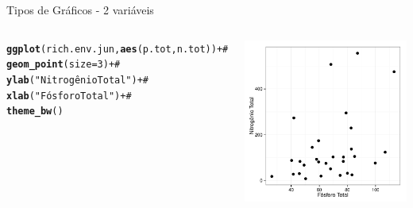 \documentclass{beamer}\usepackage[]{graphicx}\usepackage[]{color}
\makeatletter
\newcommand{\hlnum}[1]{\textcolor[rgb]{0.686,0.059,0.569}{#1}}%
\newcommand{\hlstr}[1]{\textcolor[rgb]{0.192,0.494,0.8}{#1}}%
\newcommand{\hlcom}[1]{\textcolor[rgb]{0.678,0.584,0.686}{\textit{#1}}}%
\newcommand{\hlopt}[1]{\textcolor[rgb]{0,0,0}{#1}}%
\newcommand{\hlstd}[1]{\textcolor[rgb]{0.345,0.345,0.345}{#1}}%
\newcommand{\hlkwc}[1]{\textcolor[rgb]{0.333,0.667,0.333}{#1}}%
\newcommand{\hlkwd}[1]{\textcolor[rgb]{0.737,0.353,0.396}{\textbf{#1}}}%
\newenvironment{kframe}{%
 \def\at@end@of@kframe{}%
 \ifinner\ifhmode%
  \def\at@end@of@kframe{\end{minipage}}%
  \begin{minipage}{\columnwidth}%
 \fi\fi%
 \def\FrameCommand##1{\hskip\@totalleftmargin \hskip-\fboxsep
 \colorbox{shadecolor}{##1}\hskip-\fboxsep
     \hskip-\linewidth \hskip-\@totalleftmargin \hskip\columnwidth}%
 \MakeFramed {\advance\hsize-\width
   \@totalleftmargin\z@ \linewidth\hsize
   \@setminipage}}%
 {\par\unskip\endMakeFramed%
 \at@end@of@kframe}
\newenvironment{knitrout}{}{} %
\renewenvironment{knitrout}{\setlength{\topsep}{0mm}}{}
\makeatother
\begin{document}
\begin{frame}[fragile]{Tipos de Gráficos - 2 variáveis}

\begin{columns}[t]


\begin{knitrout}\tiny
{}\color{fgcolor}\begin{kframe}
\begin{alltt}
\hlkwd{ggplot}\hlstd{(rich.env.jun,}\hlkwd{aes}\hlstd{(p.tot,n.tot))} \hlopt{+}\hlcom{#}
  \hlkwd{geom_point}\hlstd{(}\hlkwc{size}\hlstd{=}\hlnum{3}\hlstd{)} \hlopt{+}\hlcom{#}
  \hlkwd{ylab}\hlstd{(}\hlstr{"Nitrogênio Total"}\hlstd{)} \hlopt{+}\hlcom{#}
  \hlkwd{xlab}\hlstd{(}\hlstr{"Fósforo Total"}\hlstd{)} \hlopt{+}\hlcom{#}
  \hlkwd{theme_bw}\hlstd{()}
\end{alltt}
\end{kframe}
\end{knitrout}


\begin{knitrout}
\color{fgcolor}
\includegraphics[width=1\linewidth]{figure/unnamed-chunk-79-1} 

\end{knitrout}

\end{columns}

\end{frame}
\end{document}
